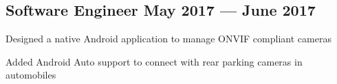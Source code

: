 \documentclass[letter,10pt]{article}
\begin{document}

\subsection{{Software Engineer \hfill May 2017 --- June 2017}}
\begin{zitemize}
\item Designed a native Android application to manage ONVIF compliant cameras
\item Added Android Auto support to connect with rear parking cameras in automobiles
\end{zitemize}

\end{document}
